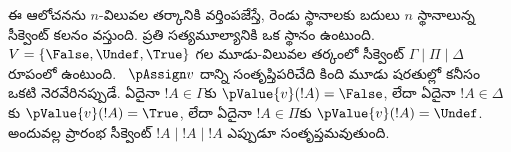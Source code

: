 \documentclass[../../../include/open-logic-section]{subfiles}
\begin{document}
ఈ ఆలోచనను $n$-విలువల తర్కానికి
వర్తింపజేస్తే, రెండు స్థానాలకు బదులు $n$
స్థానాలున్న సీక్వెంట్ కలనం వస్తుంది.
ప్రతి సత్యమూల్యానికి ఒక స్థానం ఉంటుంది.
$V = \{\False, \Undef, \True\}$ గల
మూడు-విలువల తర్కంలో సీక్వెంట్
$\Gamma \mid \Pi \mid \Delta$ రూపంలో ఉంటుంది.
~$\pAssign v$
దాన్ని సంతృప్తిపరిచేది కింది మూడు షరతుల్లో కనీసం ఒకటి
నెరవేరినప్పుడే. ఏదైనా $!A \in \Gamma$కు
$\pValue{v}(!A) = \False$, లేదా ఏదైనా
$!A \in \Delta$కు $\pValue{v}(!A) = \True$,
లేదా ఏదైనా $!A \in \Pi$కు $\pValue{v}(!A) = \Undef$.
అందువల్ల ప్రారంభ సీక్వెంట్ $!A \mid !A \mid !A$
ఎప్పుడూ సంతృప్తమవుతుంది.
\end{document}
